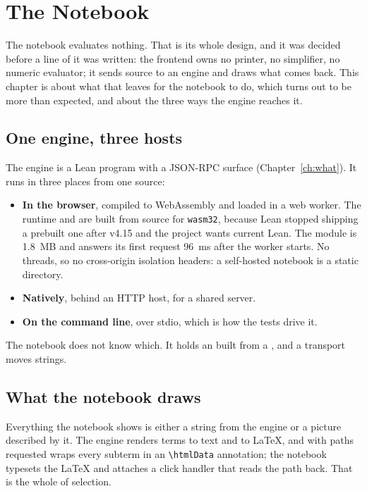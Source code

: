 \chapter{The Notebook}\label{ch:notebook}

The notebook evaluates nothing. That is its whole design, and it was decided before a line of it
was written: the frontend owns no printer, no simplifier, no numeric evaluator; it sends source to
an engine and draws what comes back. This chapter is about what that leaves for the notebook to
do, which turns out to be more than expected, and about the three ways the engine reaches it.

\section{One engine, three hosts}

The engine is a Lean program with a JSON-RPC surface (Chapter~\ref{ch:what}). It runs in three
places from one source:

\begin{itemize}[nosep]
  \item \textbf{In the browser}, compiled to WebAssembly and loaded in a web worker. The runtime
    and  are built from source for \texttt{wasm32}, because Lean stopped shipping a
    prebuilt one after v4.15 and the project wants current Lean. The module is 1.8~MB and
    answers its first request 96~ms after the worker starts. No threads, so no cross-origin
    isolation headers: a self-hosted notebook is a static directory.
  \item \textbf{Natively}, behind an HTTP host, for a shared server.
  \item \textbf{On the command line}, over stdio, which is how the tests drive it.
\end{itemize}

The notebook does not know which. It holds an  built from a ,
and a transport moves strings.

\section{What the notebook draws}

Everything the notebook shows is either a string from the engine or a picture described by it.
The engine renders terms to text and to LaTeX, and with paths requested wraps every subterm in an
\texttt{\textbackslash htmlData} annotation; the notebook typesets the LaTeX and attaches a click
handler that reads the path back. That is the whole of selection.

